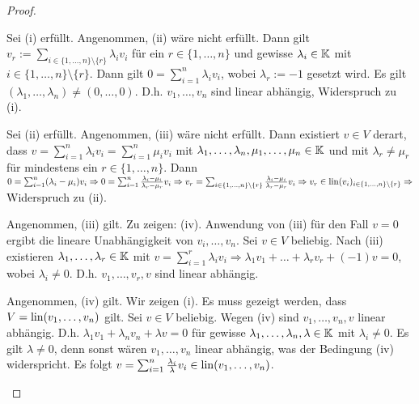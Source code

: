 \begin{proof}
\begin{description}[font=\normalfont]
	\item[(i) $ \Rightarrow $ (ii):]
	Sei (i) erfüllt. Angenommen, (ii) wäre nicht erfüllt. Dann gilt $ v_r := \sum_{i \in \{ 1, \ldots, n \} \setminus \{ r \}} \lambda_iv_i $ für ein $ r \in \{ 1, \ldots, n \} $ und gewisse $ \lambda_i \in \mathbb K $ mit $ i \in \{ 1, \ldots, n \} \setminus \{ r \} $. Dann gilt $ 0 = \sum_{i = 1}^n \lambda_iv_i $, wobei $ \lambda_r := -1 $ gesetzt wird. Es gilt $ (\lambda_1, \ldots, \lambda_n) \neq (0, \ldots, 0) $. D.h. $ v_1, \ldots, v_n $ sind linear abhängig, Widerspruch zu (i).
	
	\item[(ii) $ \Rightarrow $ (iii):]
	Sei (ii) erfüllt. Angenommen, (iii) wäre nicht erfüllt. Dann existiert $ v \in V $ derart, dass $ v = \sum_{i=1}^n \lambda_iv_i = \sum_{i=1}^n \mu_iv_i $ mit $ \lambda_1, \ldots, \lambda_n, \mu_1, \ldots, \mu_n \in \mathbb K $ und mit $ \lambda_r \neq \mu_r $ für mindestens ein $ r \in \{ 1, \ldots, n \} $. Dann $ 0 = \sum_{i=1}^n (\lambda_i - \mu_i)v_i \Rightarrow 0 = \sum_{i=1}^n \frac{\lambda_i - \mu_i}{\lambda_r - \mu_r}v_i \Rightarrow v_r = \sum_{i \in \{ 1, \ldots, n \} \setminus \{ r \}} \frac{\lambda_i - \mu_i}{\lambda_r - \mu_r}v_i \Rightarrow v_r \in \operatorname{lin}(v_i)_{i \in \{ 1, \ldots, n \} \setminus \{ r \}} \Rightarrow$ Widerspruch zu (ii).
	
	\item[(iii) $ \Rightarrow $ (iv):]
	Angenommen, (iii) gilt. Zu zeigen: (iv). Anwendung von (iii) für den Fall $ v = 0 $ ergibt die lineare Unabhängigkeit von $ v_i, \ldots, v_n $. Sei $ v \in V $ beliebig. Nach (iii) existieren $ \lambda_1, \ldots, \lambda_r \in \mathbb K $ mit $ v = \sum_{i=1}^r \lambda_iv_i \Rightarrow \lambda_1v_1 + \ldots + \lambda_rv_r + (-1)v = 0 $, wobei $ \lambda_i \neq 0 $. D.h. $ v_1, \ldots, v_r, v $ sind linear abhängig.
	
	\item[(iv) $ \Rightarrow $ (i):]
	Angenommen, (iv) gilt. Wir zeigen (i). Es muss gezeigt werden, dass $ V = \operatorname{lin}(v_1, \ldots, v_n) $ gilt. Sei $ v \in V $ beliebig. Wegen (iv) sind $ v_1, \ldots, v_n, v $ linear abhängig. D.h. $ \lambda_1v_1 + \lambda_nv_n + \lambda v = 0 $ für gewisse $ \lambda_1, \ldots, \lambda_n, \lambda \in \mathbb K $ mit $ \lambda_i \neq 0 $. Es gilt $ \lambda \neq 0 $, denn sonst wären $ v_1, \ldots, v_n $ linear abhängig, was der Bedingung (iv) widerspricht. Es folgt $ v = \sum_{i=1}^n \frac{\lambda_i}{\lambda}v_i \in \operatorname{lin}(v_1, \ldots, v_n) $. \qedhere
\end{description}
\end{proof}

